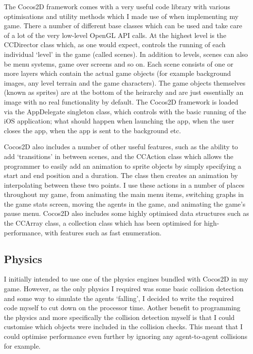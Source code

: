 \documentclass[a4paper,oneside]{report}
\begin{document}
The Cocos2D framework comes with a very useful code library with various optimisations and utility methods which I made use of when implementing my game. There a number of different base classes which can be used and take care of a lot of the very low-level OpenGL API calls. At the highest level is the CCDirector class which, as one would expect, controls the running of each individual `level' in the game (called scenes). In addition to levels, scenes can also be menu systems, game over screens and so on. Each scene consists of one or more layers which contain the actual game objects (for example background images, any level terrain and the game characters). The game objects themselves (known as sprites) are at the bottom of the heirarchy and are just essentially an image with no real functionality by default. The Cocos2D framework is loaded via the AppDelegate singleton class, which controls with the basic running of the iOS application; what should happen when launching the app, when the user closes the app, when the app is sent to the background etc. 

Cocos2D also includes a number of other useful features, such as the ability to add `transitions' in between scenes, and the CCAction class which allows the programmer to easily add an animation to sprite objects by simply specifying a start and end position and a duration. The class then creates an animation by interpolating between these two points. I use these actions in a number of places throughout my game, from animating the main menu items, switching graphs in the game stats screen, moving the agents in the game, and animating the game's pause menu. Cocos2D also includes some highly optimised data structures such as the CCArray class, a collection class which has been optimised for high-performance, with features such as fast enumeration.

\subsection{Physics}

I initially intended to use one of the physics engines bundled with Cocos2D in my game. However, as the only physics I required was some basic collision detection and some way to simulate the agents `falling', I decided to write the required code myself to cut down on the processor time. Aother benefit to programming the physics and more specifically the collision detection myself is that I could customise which objects were included in the collision checks. This meant that I could optimise performance even further by ignoring any agent-to-agent collisions for example.
\end{document}
